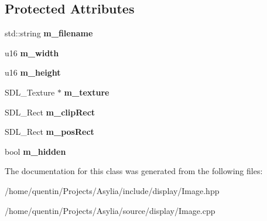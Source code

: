 \subsection*{Protected Attributes}
\begin{DoxyCompactItemize}
\item 
\hypertarget{classImage_a6dab1b1a50e0abb9db87e3bf7648c430}{std\-::string {\bfseries m\-\_\-filename}}\label{classImage_a6dab1b1a50e0abb9db87e3bf7648c430}

\item 
\hypertarget{classImage_a05be451b89de4970202c7d28f4cd70bb}{u16 {\bfseries m\-\_\-width}}\label{classImage_a05be451b89de4970202c7d28f4cd70bb}

\item 
\hypertarget{classImage_a300eba133fabf9da652e86e7334826d7}{u16 {\bfseries m\-\_\-height}}\label{classImage_a300eba133fabf9da652e86e7334826d7}

\item 
\hypertarget{classImage_a8c659004c835e42f04f6225ab8cb2af7}{S\-D\-L\-\_\-\-Texture $\ast$ {\bfseries m\-\_\-texture}}\label{classImage_a8c659004c835e42f04f6225ab8cb2af7}

\item 
\hypertarget{classImage_a9061dde7d7984463c193ae38f7e1fb3e}{S\-D\-L\-\_\-\-Rect {\bfseries m\-\_\-clip\-Rect}}\label{classImage_a9061dde7d7984463c193ae38f7e1fb3e}

\item 
\hypertarget{classImage_a970cc39a7ac6d2a608e63f080dfc7ff9}{S\-D\-L\-\_\-\-Rect {\bfseries m\-\_\-pos\-Rect}}\label{classImage_a970cc39a7ac6d2a608e63f080dfc7ff9}

\item 
\hypertarget{classImage_a1a2dc74b94194f413b18858b39ac7a50}{bool {\bfseries m\-\_\-hidden}}\label{classImage_a1a2dc74b94194f413b18858b39ac7a50}

\end{DoxyCompactItemize}


The documentation for this class was generated from the following files\-:\begin{DoxyCompactItemize}
\item 
/home/quentin/\-Projects/\-Asylia/include/display/Image.\-hpp\item 
/home/quentin/\-Projects/\-Asylia/source/display/Image.\-cpp\end{DoxyCompactItemize}
